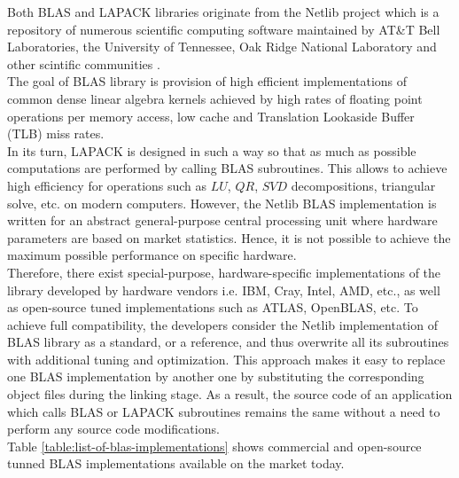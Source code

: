 Both BLAS and LAPACK libraries originate from the Netlib project which is a repository of numerous scientific computing software maintained by AT\&T Bell Laboratories, the University of Tennessee, Oak Ridge National Laboratory and other scintific communities \cite{netlib-overview}.\\


The goal of BLAS library is provision of high efficient implementations of common dense linear algebra kernels achieved by high rates of floating point operations per memory access, low cache and Translation Lookaside Buffer (TLB) miss rates.\\


In its turn, LAPACK is designed in such a way so that as much as possible computations are performed by calling BLAS subroutines. This allows to achieve high efficiency for operations such as $LU$, $QR$, $SVD$ decompositions, triangular solve, etc. on modern computers. However, the Netlib BLAS implementation is written for an abstract general-purpose central processing unit where hardware parameters are based on market statistics. Hence, it is not possible to achieve the maximum possible performance on specific hardware.\\


Therefore, there exist special-purpose, hardware-specific implementations of the library developed by hardware vendors i.e. IBM, Cray, Intel, AMD, etc., as well as open-source tuned implementations such as ATLAS, OpenBLAS, etc. To achieve full compatibility, the developers consider the Netlib implementation of BLAS library as a standard, or a reference, and thus overwrite all its subroutines with additional tuning and optimization. This approach makes it easy to replace one BLAS implementation by another one by substituting the corresponding object files during the linking stage. As a result, the source code of an application which calls BLAS or LAPACK subroutines remains the same without a need to perform any source code modifications.\\
 

Table \ref{table:list-of-blas-implementations} shows commercial and open-source tunned BLAS implementations available on the market today.\\

